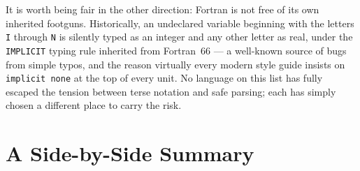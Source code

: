 \bigskip
\noindent It is worth being fair in the other direction: Fortran is not free of its own inherited footguns. Historically, an undeclared variable beginning with the letters \texttt{I} through \texttt{N} is silently typed as an integer and any other letter as real, under the \texttt{IMPLICIT} typing rule inherited from Fortran~66 --- a well-known source of bugs from simple typos, and the reason virtually every modern style guide insists on \texttt{implicit none} at the top of every unit. No language on this list has fully escaped the tension between terse notation and safe parsing; each has simply chosen a different place to carry the risk.

\section{A Side-by-Side Summary}

